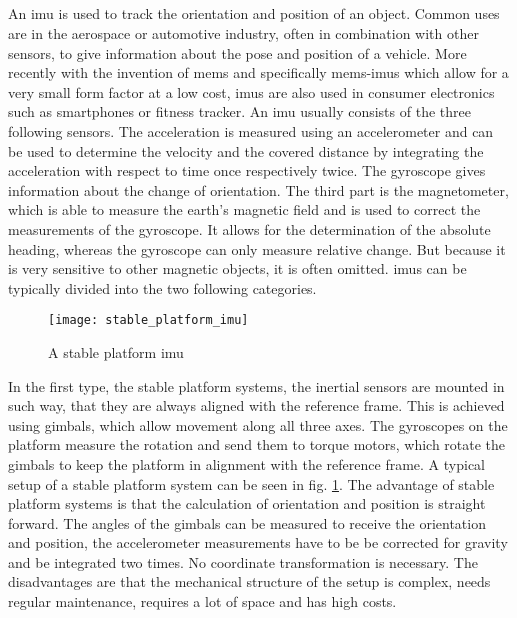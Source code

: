 \subsection{}
An \gls{imu} is used to track the orientation and position of an object.
Common uses are in the aerospace or automotive industry, often in combination with other sensors, to give information about the pose and position of a vehicle.
More recently with the invention of \gls{mems} and specifically \gls{mems}-\gls{imu}s which allow for a very small form factor at a low cost, \gls{imu}s are also used in consumer electronics such as smartphones or fitness tracker.
An \gls{imu} usually consists of the three following sensors.
The acceleration is measured using an accelerometer and can be used to determine the velocity and the covered distance by integrating the acceleration with respect to time once respectively twice.
The gyroscope gives information about the change of orientation.
The third part is the magnetometer, which is able to measure the earth's magnetic field and is used to correct the measurements of the gyroscope.
It allows for the determination of the absolute heading, whereas the gyroscope can only measure relative change. But because it is very sensitive to other magnetic objects, it is often omitted.
\gls{imu}s can be typically divided into the two following categories.\\
\begin{figure}[htbp]
	\centering
	\texttt{[image: stable\_platform\_imu]}
	\caption{A stable platform \acrshort{imu} \cite{Woodman2007}}
	\label{fig:stable_platform_imu}
\end{figure}
In the first type, the stable platform systems, the inertial sensors are mounted in such way, that they are always aligned with the reference frame.
This is achieved using gimbals, which allow movement along all three axes.
The gyroscopes on the platform measure the rotation and send them to torque motors, which rotate the gimbals to keep the platform in alignment with the reference frame.
A typical setup of a stable platform system can be seen in fig. \ref{fig:stable_platform_imu}.
The advantage of stable platform systems is that the calculation of orientation and position is straight forward.
The angles of the gimbals can be measured to receive the orientation and position, the accelerometer measurements have to be be corrected for gravity and be integrated two times.
No coordinate transformation is necessary.
The disadvantages are that the mechanical structure of the setup is complex, needs regular maintenance, requires a lot of space and has high costs.\\
